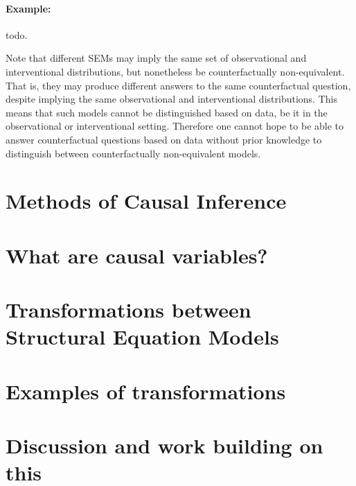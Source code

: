 \paragraph{Example:} todo.

Note that different SEMs may imply the same set of observational and interventional distributions, but nonetheless be counterfactually non-equivalent. That is, they may produce different answers to the same counterfactual question, despite implying the same observational and interventional distributions. This means that such models cannot be distinguished based on data, be it in the observational or interventional setting. Therefore one cannot hope to be able to answer counterfactual questions based on data without prior knowledge to distinguish between counterfactually non-equivalent models.



\section{Methods of Causal Inference}
\section{What are causal variables?}
\section{Transformations between Structural Equation Models}
\section{Examples of transformations}
\section{Discussion and work building on this}










































